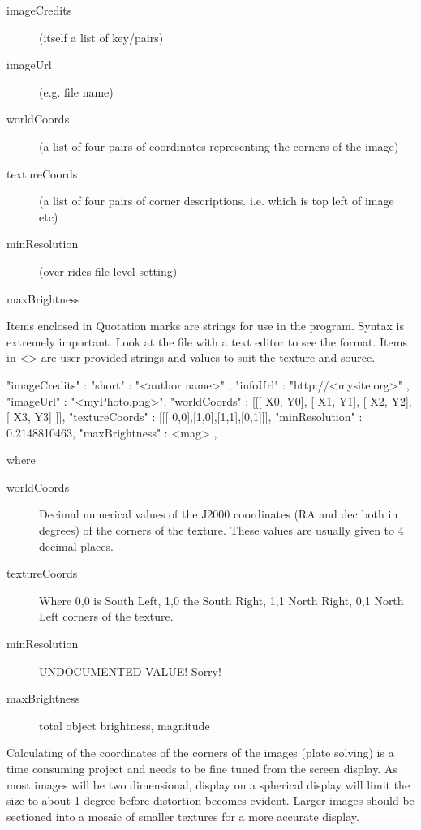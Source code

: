 \begin{description}
  \begin{description}
  \item[imageCredits] (itself a list of key/pairs)
  \item[imageUrl] (e.g. file name)
  \item[worldCoords] (a list of four pairs of coordinates representing the corners of the image)
  \item[textureCoords] (a list of four pairs of corner descriptions. i.e. which is top left of image etc)
  \item[minResolution] (over-rides file-level setting)
  \item[maxBrightness]
  \end{description}
\end{description}

Items enclosed in Quotation marks are strings for use in the program.
Syntax is extremely important. Look at the file with a text editor to
see the format. Items in \textless{}\textgreater{} are user provided
strings and values to suit the texture and source.

\begin{configfileScr}
{
  "imageCredits"  : { "short" : "<author name>" , 
                      "infoUrl" : "http://<mysite.org>" 
                    }, 
  "imageUrl"      : "<myPhoto.png>",
  "worldCoords"   : [[[ X0, Y0], [ X1, Y1], [ X2, Y2], [ X3, Y3] ]], 
  "textureCoords" : [[[ 0,0],[1,0],[1,1],[0,1]]], 
  "minResolution" : 0.2148810463,
  "maxBrightness" : <mag>
},
\end{configfileScr}

where 

\begin{description}
\item[worldCoords] Decimal numerical values of the J2000 coordinates (RA and dec both in degrees) of the corners of the texture. These values are usually given to 4 decimal places.
\item[textureCoords]  Where 0,0 is South Left, 1,0 the South Right, 1,1 North Right, 0,1 North Left corners of the texture.
\item[minResolution] UNDOCUMENTED VALUE! Sorry!%
\item[maxBrightness] total object brightness, magnitude 
\end{description}


Calculating of the coordinates of the corners of the images (plate solving) is
a time consuming project and needs to be fine tuned from the screen
display. As most images will be two dimensional, display on a spherical
display will limit the size to about 1 degree before distortion becomes
evident. Larger images should be sectioned into a mosaic of smaller
textures for a more accurate display.

